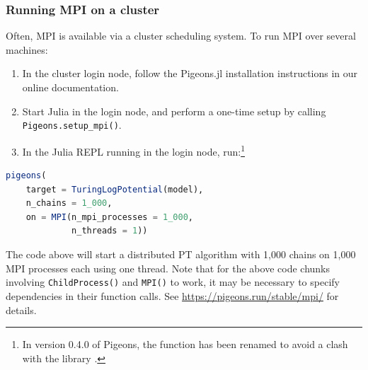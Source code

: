 \subsubsection{Running MPI on a cluster}
Often, MPI is available via a cluster scheduling system. To run MPI over 
several machines:
\begin{enumerate}
    \item In the cluster login node, follow the Pigeons.jl installation instructions
    in our online documentation. 
    \item Start Julia in the login node, and perform a one-time setup by 
    calling \texttt{Pigeons.setup\_mpi()}.
    \item In the Julia REPL running in the login node, run:\footnote{In 
    version 0.4.0 of Pigeons, the function  has been renamed  
    to avoid a clash with the library .}
\end{enumerate}
\begin{lstlisting}[language = Julia]
pigeons(
    target = TuringLogPotential(model), 
    n_chains = 1_000,
    on = MPI(n_mpi_processes = 1_000, 
             n_threads = 1))
\end{lstlisting}
The code above will start a distributed PT algorithm with 1,000 chains on 1,000 
MPI processes each using one thread.
Note that for the above code chunks involving \texttt{ChildProcess()} and 
\texttt{MPI()} to work, it may be necessary to specify dependencies in their 
function calls. See \url{https://pigeons.run/stable/mpi/} for details. 


